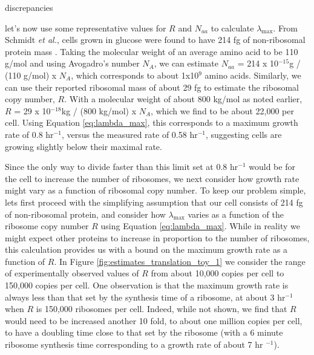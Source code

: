 discrepancies \documentclass[11pt, letterpaper]{article}
\begin{document}
let's now use some representative values for $R$ and $N_{aa}$ to calculate
$\lambda_{\text{max}}$. From Schmidt {\it et al.}, cells grown in glucose were
found to have 214 fg of non-ribosomal  protein mass \cite{Schmidt2016}. Taking
the molecular weight of an average amino acid to be 110 g/mol and using Avogadro's number $N_A$, we can estimate
$N_{aa}$ = 214 x 10$^{-15}$g / (110 g/mol) x $N_A$,
which corresponds to about 1x10$^9$ amino acids.  Similarly, we can use their
reported ribosomal mass of about 29 fg to estimate the ribosomal copy number,
$R$. With a molecular weight of about 800 kg/mol as noted earlier,  $R$ =
29 x 10$^{-18}$kg / (800 kg/mol) x $N_A$,   which we find to be about 22,000 per
cell. Using Equation \ref{eq:lambda_max}, this corresponds to a maximum growth
rate of 0.8 hr$^{-1}$, versus the measured rate of 0.58 hr$^{-1}$, suggesting
cells are growing slightly below their maximal rate.

Since the only way to divide faster than this limit set at 0.8 hr$^{-1}$ would be
for the cell to increase the number of ribosomes, we next consider how
growth rate might vary as a function of ribosomal copy number. To
keep our problem simple,  lets first proceed with the simplifying assumption
that our cell consists of  214 fg of non-ribosomal protein, and consider
how $\lambda_{\text{max}}$ varies  as a function of the ribosome copy number $R$
using Equation \ref{eq:lambda_max}.  While in reality we might expect other
proteins to increase in proportion to the number of ribosomes, this calculation
provides us with a bound on the maximum growth rate as a function of $R$.  In
Figure \ref{fig:estimates_translation_toy_1} we consider the range of experimentally observed values
of $R$ from about 10,000 copies per cell to
150,000 copies per cell. One observation is that
the maximum growth rate is always less than that set by the synthesis time of a
ribosome, at about 3 hr$^{-1}$ when $R$ is 150,000 ribosomes per cell. Indeed, while not shown,
we find that $R$ would need to be increased another 10 fold, to
about one million copies per cell, to have a doubling time close to that set by the ribosome (with a 6 minute ribosome synthesis time
corresponding to a growth rate of about 7 hr $^{-1}$).

\end{document}
